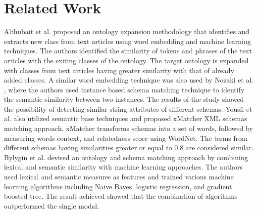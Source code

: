 \documentclass{ieeeaccess}
\begin{document}
\section{Related Work}
\label{relatedwork}
Althubait et al. \cite{althubaiti2020combining} proposed an ontology expansion methodology that identifies and extracts new class from text articles using word embedding and machine learning techniques. The authors identified the similarity of tokens and phrases of the text articles with the exiting classes of the ontology. The target ontology is expanded with classes from text articles having greater similarity with that of already added classes. A similar word embedding technique was also used by Nozaki et al. \cite{nozaki2019semantic}, where the authors used instance based schema matching technique to identify the semantic similarity between two instances. The results of the study showed the possibility of detecting similar string attributes of different schemas. Yousfi et al. \cite{yousfi2020xmatcher} also utilized semantic base techniques and proposed xMatcher XML schemas matching approach. xMatcher transforms schemas into a set of words, followed by measuring words context, and relatedness score using WordNet. The terms from different schemas having similarities greater or equal to 0.8 are considered similar. 
Bylygin et al. \cite{bulygin2018combining} devised an ontology and schema matching approach by combining lexical and semantic similarity with machine learning approaches.  The authors used lexical and semantic measures as features and trained various machine learning algorithms including Naive Bayes, logistic regression, and gradient boosted tree. The result achieved showed that the combination of algorithms outperformed the single modal.
\end{document}
